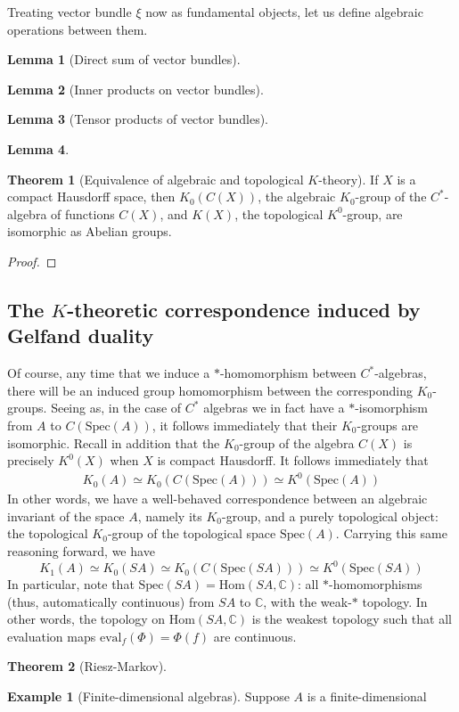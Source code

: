\documentclass[aps,pra,showpacs,notitlepage,onecolumn,superscriptaddress,nofootinbib]{revtex4-1}
\theoremstyle{definition}
\newtheorem{lemma}{Lemma}[section]
\newtheorem{theorem}{Theorem}[section]
\newtheorem{example}{Example}[section]
\begin{document}
\noindent Treating vector bundle $\xi$ now as fundamental objects, let us define algebraic operations between them.

\begin{lemma}[Direct sum of vector bundles]

\end{lemma}

\begin{lemma}[Inner products on vector bundles]
\end{lemma}

\begin{lemma}[Tensor products of vector bundles]
\end{lemma}

\begin{lemma}

\end{lemma}

\begin{theorem}[Equivalence of algebraic and topological $K$-theory]
If $X$ is a compact Hausdorff space, then $K_0(C(X))$, the algebraic $K_0$-group of the $C^{*}$-algebra of functions $C(X)$, and $K(X)$, the topological $K^{0}$-group, are isomorphic as Abelian groups.
\end{theorem}
\begin{proof}

  \end{proof}

\subsection{The $K$-theoretic correspondence induced by Gelfand duality}

\noindent Of course, any time that we induce a $*$-homomorphism between $C^{*}$-algebras, there will be an induced group homomorphism between the corresponding
$K_0$-groups. Seeing as, in the case of $C^{*}$ algebras we in fact have a $*$-isomorphism from $A$ to $C(\text{Spec}(A))$, it follows immediately that their $K_0$-groups
are isomorphic. Recall in addition that the $K_0$-group of the algebra $C(X)$ is precisely $K^{0}(X)$ when $X$ is compact Hausdorff. It follows immediately that
\begin{align}
  K_0(A) \simeq K_0(C(\text{Spec}(A))) \simeq K^0(\text{Spec}(A))
\end{align}
In other words, we have a well-behaved correspondence between an algebraic invariant of the space $A$, namely its $K_0$-group, and
a purely topological object: the topological $K_0$-group of the topological space $\text{Spec}(A)$. Carrying this same reasoning forward,
we have
\begin{equation}
  K_1(A) \simeq K_0(SA) \simeq  K_0(C(\text{Spec}(SA))) \simeq K^0(\text{Spec}(SA))
\end{equation}
In particular, note that $\text{Spec}(SA) = \text{Hom}(SA, \mathbb{C})$: all $*$-homomorphisms (thus, automatically continuous) from $SA$ to $\mathbb{C}$, with the weak-$*$ topology.
In other words, the topology on $\text{Hom}(SA, \mathbb{C})$ is the weakest topology such that all evaluation maps $\text{eval}_{f}(\Phi) = \Phi(f)$
are continuous.

\begin{theorem}[Riesz-Markov]

  \end{theorem}

\begin{example}[Finite-dimensional algebras]
  Suppose $A$ is a finite-dimensional 
  \end{example}
\end{document}
